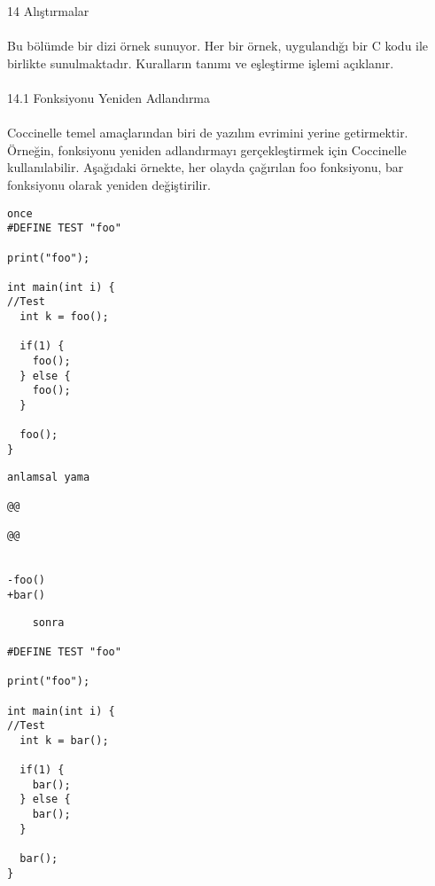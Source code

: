 \documentclass[22pt]{article}
\begin{document}
14 Alıştırmalar\\
\\
Bu bölümde bir dizi örnek sunuyor. Her bir örnek, uygulandığı bir C kodu ile birlikte sunulmaktadır. Kuralların tanımı ve eşleştirme işlemi açıklanır.\\
\\
14.1 Fonksiyonu Yeniden Adlandırma\\
\\
Coccinelle temel amaçlarından biri de yazılım evrimini yerine getirmektir. Örneğin, fonksiyonu yeniden adlandırmayı gerçekleştirmek için Coccinelle kullanılabilir. Aşağıdaki örnekte, her olayda çağırılan foo fonksiyonu, bar fonksiyonu olarak yeniden değiştirilir.\\

\begin{multicols*}{3}
				
\begin{lstlisting}
once
#DEFINE TEST "foo"		

print("foo");			

int main(int i) {		
//Test				
  int k = foo();		

  if(1) {			
    foo();  			
  } else {			
    foo();			
  }				

  foo();			
}
\end{lstlisting}

\columnbreak

\begin{lstlisting}
anlamsal yama		

@@			

@@			

			
-foo()			
+bar()
\end{lstlisting}
\columnbreak
\begin{lstlisting}
	sonra

#DEFINE TEST "foo"

print("foo");

int main(int i) {
//Test
  int k = bar();

  if(1) {
    bar();
  } else {
    bar();	
  }

  bar();
}
\end{lstlisting}
\end{multicols*}
\end{document}

